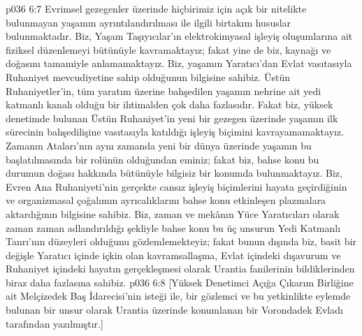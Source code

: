 \vs p036 6:7 Evrimsel gezegenler üzerinde hiçbirimiz için açık bir nitelikte bulunmayan yaşamın ayrıntılandırılması ile ilgili birtakım hususlar bulunmaktadır. Biz, Yaşam Taşıyıcılar’ın elektrokimyasal işleyiş oluşumlarına ait fiziksel düzenlemeyi bütünüyle kavramaktayız; fakat yine de biz, kaynağı ve doğasını tamamiyle anlamamaktayız. Biz, yaşamın Yaratıcı’dan Evlat vasıtasıyla Ruhaniyet  mevcudiyetine sahip olduğunun bilgisine sahibiz. Üstün Ruhaniyetler’in, tüm yaratım üzerine bahşedilen yaşamın nehrine ait yedi katmanlı kanalı olduğu bir ihtimalden çok daha fazlasıdır. Fakat biz, yüksek denetimde bulunan Üstün Ruhaniyet’in yeni bir gezegen üzerinde yaşamın ilk sürecinin bahşedilişine vasıtasıyla katıldığı işleyiş biçimini kavrayamamaktayız. Zamanın Ataları’nın aynı zamanda yeni bir dünya üzerinde yaşamın bu başlatılmasında bir rolünün olduğundan eminiz; fakat biz, bahse konu bu durumun doğası hakkında bütünüyle bilgisiz bir konumda bulunmaktayız. Biz, Evren Ana Ruhaniyeti’nin gerçekte cansız işleyiş biçimlerini hayata geçirdiğinin ve organizmasal çoğalımın ayrıcalıklarını bahse konu etkinleşen plazmalara aktardığının bilgisine sahibiz. Biz, zaman ve mekânın Yüce Yaratıcıları olarak zaman zaman adlandırıldığı şekliyle bahse konu bu üç unsurun Yedi Katmanlı Tanrı’nın düzeyleri olduğunu gözlemlemekteyiz; fakat bunun dışında biz, basit bir değişle Yaratıcı içinde içkin olan kavramsallaşma, Evlat içindeki dışavurum ve Ruhaniyet içindeki hayatın gerçekleşmesi olarak Urantia fanilerinin bildiklerinden biraz daha fazlasına sahibiz.
\vs p036 6:8 [Yüksek Denetimci Açığa Çıkarım Birliğine ait Melçizedek Baş İdarecisi’nin isteği ile, bir gözlemci ve bu yetkinlikte eylemde bulunan bir unsur olarak Urantia üzerinde konumlanan bir Vorondadek Evladı tarafından yazılmıştır.]
